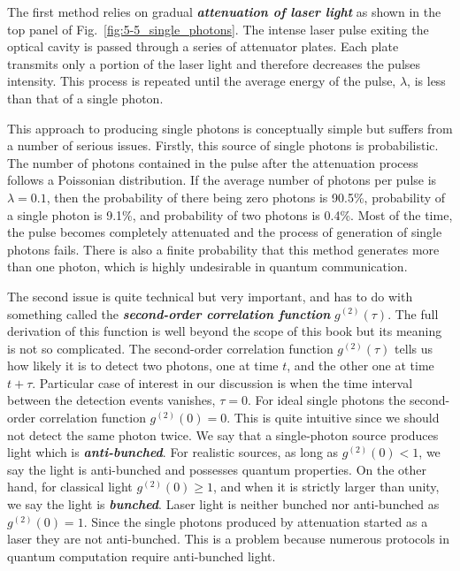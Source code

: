 The first method relies on gradual \textit{\textbf{attenuation of laser light}} as shown in
the top panel of Fig.~\ref{fig:5-5_single_photons}.
The intense laser pulse exiting the optical cavity is passed through a series of attenuator plates.
Each plate transmits only a portion of the laser light and therefore decreases the pulses intensity.
This process is repeated until the average energy of the pulse, $\lambda$, is less than that of a single photon.

This approach to producing single photons is conceptually simple but suffers from a number of serious issues.
Firstly, this source of single photons is probabilistic.
The number of photons contained in the pulse after the attenuation process follows a Poissonian distribution.
If the average number of photons per pulse is $\lambda = 0.1$, then the probability of there being zero photons is 90.5\%, probability of a single photon is 9.1\%, and probability of two photons is 0.4\%.
Most of the time, the pulse becomes completely attenuated and the process of generation of single photons fails.
There is also a finite probability that this method generates more than one photon, which is highly undesirable in quantum communication.

The second issue is quite technical but very important, and has to do with something called the \textit{\textbf{second-order correlation function}} $g^{(2)}(\tau)$.
The full derivation of this function is well beyond the scope of this book but its meaning is not so complicated.
The second-order correlation function $g^{(2)}(\tau)$ tells us how likely it is to detect two photons, one at time $t$, and the other one at time $t+\tau$.
Particular case of interest in our discussion is when the time interval between the detection events vanishes, $\tau = 0$.
For ideal single photons the second-order correlation function $g^{(2)}(0) = 0$.
This is quite intuitive since we should not detect the same photon twice.
We say that a single-photon source produces light which is \textit{\textbf{anti-bunched}}.
For realistic sources, as long as $g^{(2)}(0) < 1$, we say the light is anti-bunched and possesses quantum properties.
On the other hand, for classical light $g^{(2)}(0) \geq 1$, and when it is strictly larger than unity, we say the light is \textit{\textbf{bunched}}.
Laser light is neither bunched nor anti-bunched as $g^{(2)}(0)=1$.
Since the single photons produced by attenuation started as a laser they are not anti-bunched.
This is a problem because numerous protocols in quantum computation require anti-bunched light.

